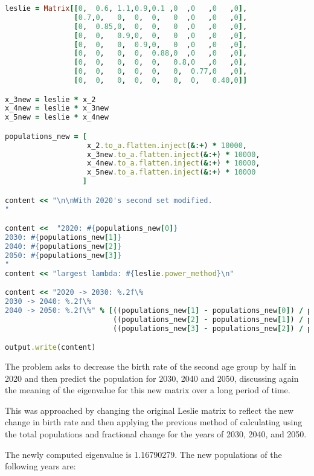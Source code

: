 \documentclass[letterpaper,12pt]{article}
\begin{document}
\lstset{caption=Populations}
\begin{lstlisting}[language=ruby]
leslie = Matrix[[0,  0.6, 1.1,0.9,0.1 ,0  ,0   ,0   ,0],
                [0.7,0,   0,  0,  0,   0  ,0   ,0   ,0],
                [0,  0.85,0,  0,  0,   0  ,0   ,0   ,0],
                [0,  0,   0.9,0,  0,   0  ,0   ,0   ,0],
                [0,  0,   0,  0.9,0,   0  ,0   ,0   ,0],
                [0,  0,   0,  0,  0.88,0  ,0   ,0   ,0],
                [0,  0,   0,  0,  0,   0.8,0   ,0   ,0],
                [0,  0,   0,  0,  0,   0,  0.77,0   ,0],
                [0,  0,   0,  0,  0,   0,  0,   0.40,0]]

x_3new = leslie * x_2
x_4new = leslie * x_3new
x_5new = leslie * x_4new

populations_new = [
                   x_2.to_a.flatten.inject(&:+) * 10000,
                   x_3new.to_a.flatten.inject(&:+) * 10000,
                   x_4new.to_a.flatten.inject(&:+) * 10000,
                   x_5new.to_a.flatten.inject(&:+) * 10000
                  ]

content << "\n\nWith 2020's second set modified.
"

content <<  "2020: #{populations_new[0]}
2030: #{populations_new[1]}
2040: #{populations_new[2]}
2050: #{populations_new[3]}
"
content << "largest lambda: #{leslie.power_method}\n"

content << "2020 -> 2030: %.2f\%
2030 -> 2040: %.2f\%
2040 -> 2050: %.2f\%" % [((populations_new[1] - populations_new[0]) / populations_new[0] * 100),
                         ((populations_new[2] - populations_new[1]) / populations_new[1] * 100),
                         ((populations_new[3] - populations_new[2]) / populations_new[2] * 100)]

output.write(content)
\end{lstlisting}

The problem asks to decrease the birth rate of the second age group by half in 2020
and then predict the population for 2030, 2040 and 2050, discussing again the meaning
of the eigenvalue for this new matrix over a long period of time.

This was approached by changing the original Leslie matrix to reflect the new change
in birth rate and then applying the previous method of calculating using the total populations
and fractional change for the years of 2030, 2040, and 2050. 

The newly computed eigenvalue is 1.16790279. The new populations of the following years are:
\end{document}
